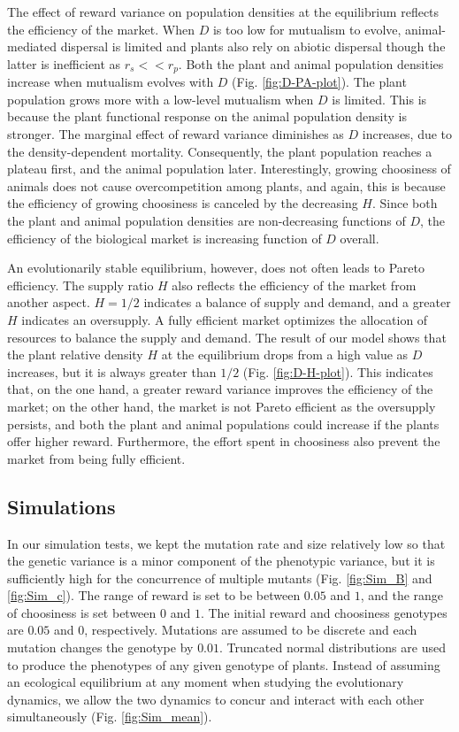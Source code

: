 \documentclass[12pt]{article}
\begin{document}
The effect of reward variance on population densities at the equilibrium reflects the efficiency of the market. When $D$ is too low for mutualism to evolve, animal-mediated dispersal is limited and plants also rely on abiotic dispersal though the latter is inefficient as $r_s<<r_p$. Both the plant and animal population densities increase when mutualism evolves with $D$ (Fig. \ref{fig:D-PA-plot}). The plant population grows more with a low-level mutualism when $D$ is limited. This is because the plant functional response on the animal population density is stronger. The marginal effect of reward variance diminishes as $D$ increases, due to the density-dependent mortality. Consequently, the plant population reaches a plateau first, and the animal population later. Interestingly, growing choosiness of animals does not cause overcompetition among plants, and again, this is because the efficiency of growing choosiness is canceled by the decreasing $H$. Since both the plant and animal population densities are non-decreasing functions of $D$, the efficiency of the biological market is increasing function of $D$ overall.

An evolutionarily stable equilibrium, however, does not often leads to Pareto efficiency. The supply ratio $H$ also reflects the efficiency of the market from another aspect. $H=1/2$ indicates a balance of supply and demand, and a greater $H$ indicates an oversupply. A fully efficient market optimizes the allocation of resources to balance the supply and demand. The result of our model shows that the plant relative density $H$ at the equilibrium drops from a high value as $D$ increases, but it is always greater than $1/2$ (Fig. \ref{fig:D-H-plot}). This indicates that, on the one hand, a greater reward variance improves the efficiency of the market; on the other hand, the market is not Pareto efficient as the oversupply persists, and both the plant and animal populations could increase if the plants offer higher reward. Furthermore, the effort spent in choosiness also prevent the market from being fully efficient.

\subsection*{Simulations}

In our simulation tests, we kept the mutation rate and size relatively low so that the genetic variance is a minor component of the phenotypic variance, but it is sufficiently high for the concurrence of multiple mutants (Fig. \ref{fig:Sim_B} and \ref{fig:Sim_c}). The range of reward is set to be between $0.05$ and $1$, and the range of choosiness is set between $0$ and $1$. The initial reward and choosiness genotypes are $0.05$ and $0$, respectively. Mutations are assumed to be discrete and each mutation changes the genotype by $0.01$. Truncated normal distributions are used to produce the phenotypes of any given genotype of plants. Instead of assuming an ecological equilibrium at any moment when studying the evolutionary dynamics, we allow the two dynamics to concur and interact with each other simultaneously (Fig. \ref{fig:Sim_mean}). 
\end{document}
